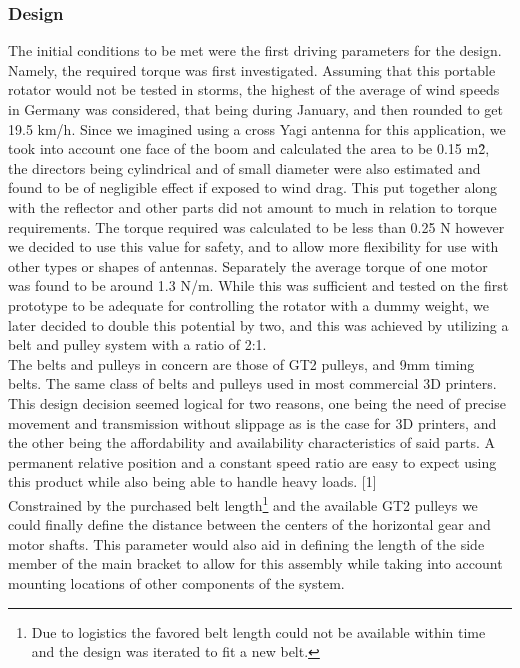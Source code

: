 \subsubsection*{Design} 
The initial conditions to be met were the first driving parameters for the design. Namely, the required torque was first investigated. Assuming that this portable rotator would not be tested in storms, the highest of the average of wind speeds in Germany was considered, that being during January, and then rounded to get 19.5 km/h. Since we imagined using a cross Yagi antenna for this application, we took into account one face of the boom and calculated the area to be 0.15 m\^2, the directors being cylindrical and of small diameter were also estimated and found to be of negligible effect if exposed to wind drag. This put together along with the reflector and other parts did not amount to much in relation to torque requirements. The torque required was calculated to be less than 0.25 N however we decided to use this value for safety, and to allow more flexibility for use with other types or shapes of antennas. Separately the average torque of one motor was found to be around 1.3 N/m. While this was sufficient and tested on the first prototype to be adequate for controlling the rotator with a dummy weight, we later decided to double this potential by two, and this was achieved by utilizing a belt and pulley system with a ratio of 2:1.\\
The belts and pulleys in concern are those of GT2 pulleys, and 9mm timing belts. The same class of belts and pulleys used in most commercial 3D printers. This design decision seemed logical for two reasons, one being the need of precise movement and transmission without slippage as is the case for 3D printers, and the other being the affordability and availability characteristics of said parts. A permanent relative position and a constant speed ratio are easy to expect using this product while also being able to handle heavy loads. [1]\\
Constrained by the purchased belt length\footnote{Due to logistics the favored belt length could not be available within time and the design was iterated to fit a new belt.} and the available GT2 pulleys we could finally define the distance between the centers of the horizontal gear and motor shafts. This parameter would also aid in defining the length of the side member of the main bracket to allow for this assembly while taking into account mounting locations of other components of the system. \\
